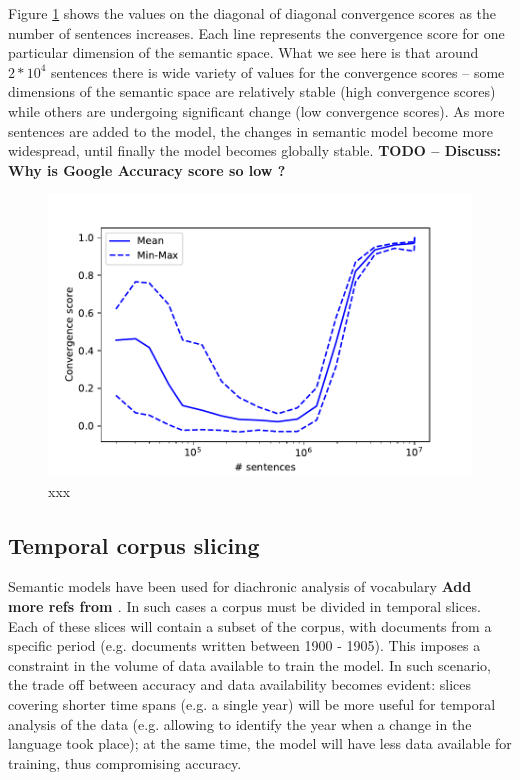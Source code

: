 \documentclass{article} %
\begin{document}
Figure \ref{fig:spreadDiagonal} shows the values on the diagonal of diagonal convergence scores as the number of sentences increases. Each line represents the convergence score for one particular dimension of the semantic space. What we see here is that around $2 * 10^4$ sentences there is wide variety of values for the convergence scores -- some dimensions of the semantic space are relatively stable (high convergence scores) while others are undergoing significant change (low convergence scores). As more sentences are added to the model, the changes in semantic model become more widespread, until finally the model becomes globally stable. \textbf{TODO -- Discuss: Why is Google Accuracy score so low ?}

\begin{figure}
 \includegraphics[width=\textwidth]{spreadDiagonalValues.pdf} 
 \caption{xxx}
 \label{fig:spreadDiagonal}
\end{figure}

\subsection{Temporal corpus slicing}
\label{subsec:temporal_corpus_slicing}
Semantic models have been used for diachronic analysis of vocabulary \cite{Martinez_Histo2016,Hellrich_COLING2016} \textbf{Add more refs from \cite{Hellrich_COLING2016}}. In such cases a corpus must be divided in temporal slices. Each of these slices will contain a subset of the corpus, with documents from a specific period (e.g. documents written between 1900 - 1905). This imposes a constraint in the volume of data available to train the model. In such scenario, the trade off between accuracy and data availability becomes evident: slices covering shorter time spans (e.g. a single year) will be more useful for temporal analysis of the data (e.g. allowing to identify the year when a change in the language took place); at the same time, the model will have less data available for training, thus compromising accuracy.
\end{document}
